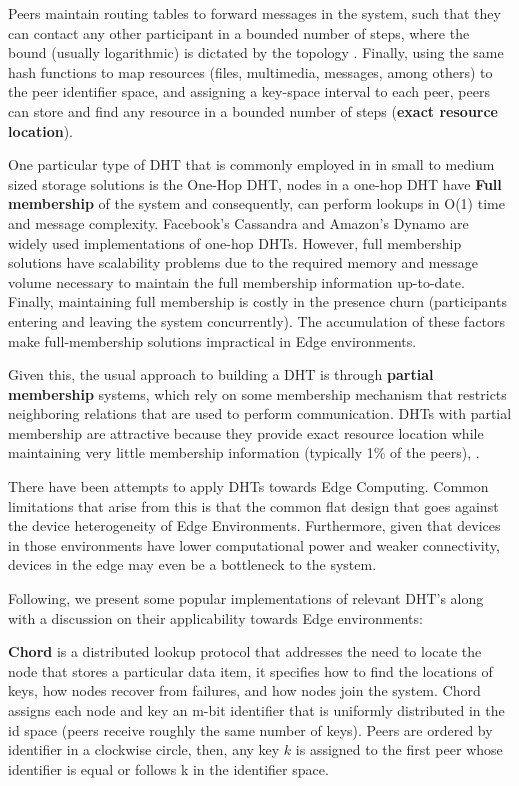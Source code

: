 Peers maintain routing tables to forward messages in the system, such that they can contact any other participant in a bounded number of steps, where the bound (usually logarithmic) is dictated by the topology . Finally, using the same hash functions to map resources (files, multimedia, messages, among others) to the peer identifier space, and assigning a key-space interval to each peer, peers can store and find any resource in a bounded number of steps (\textbf{exact resource location}).

One particular type of DHT that is commonly employed in in small to medium sized storage solutions is the One-Hop DHT, nodes in a one-hop DHT have \textbf{Full membership} of the system and consequently, can perform lookups in O(1) time and message complexity. Facebook's Cassandra \cite{lakshman2010cassandra} and Amazon's Dynamo \cite{decandia2007dynamo} are widely used implementations of one-hop DHTs. However, full membership solutions have scalability problems due to the required memory and message volume necessary to maintain the full membership information up-to-date. Finally, maintaining full membership is costly in the presence churn (participants entering and leaving the system concurrently). The accumulation of these factors make full-membership solutions impractical in Edge environments.

Given this, the usual approach to building a DHT is through \textbf{partial membership} systems, which rely on some membership mechanism that restricts neighboring relations that are used to perform communication. DHTs with partial membership are attractive because they provide exact resource location while maintaining very little membership information (typically 1\% of the peers), . 

There have been attempts to apply DHTs towards Edge Computing. Common limitations that arise from this is that the common flat design that goes against the device heterogeneity of Edge Environments. Furthermore, given that devices in those environments have lower computational power and weaker connectivity, devices in the edge may even be a bottleneck to the system. 

Following, we present some popular implementations of relevant DHT's along with a discussion on their applicability towards Edge environments:

\textbf{Chord} \cite{stoica2003chord} is a distributed lookup protocol that addresses the need to locate the node that stores a particular data item, it specifies how to find the locations of keys, how nodes recover from failures, and how nodes join the system. Chord assigns each node and key an m-bit identifier that is uniformly distributed in the id space (peers receive roughly the same number of keys). Peers are ordered by identifier in a clockwise circle, then, any key \(k\) is assigned to the first peer whose identifier is equal or follows k in the identifier space. 

